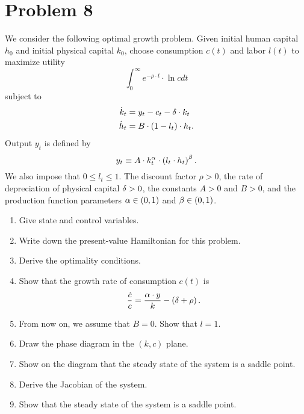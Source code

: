 \documentclass[letterpaper,12pt,leqno]{article}
\begin{document}
\section*{Problem 8}

We consider the following optimal growth problem. Given initial human capital $h_{0}$ and initial physical capital $k_{0}$, choose consumption $c(t) $ and labor $l(t) $ to maximize utility
\begin{equation*}
\int_{0}^{\infty}e^{-\rho\cdot  t}\cdot \ln{c} dt
\end{equation*}
subject to
\begin{align*}
\dot{k}_{t} &=y_{t}-c_{t}-\delta\cdot  k_{t} \\
\dot{h}_{t} &=B\cdot \left( 1-l_{t} \right)\cdot  h_{t}.
\end{align*}
Output $y_{t}$ is defined by
\[y_{t}\equiv A\cdot k_{t}^{\alpha}\cdot \left( l_{t}\cdot h_{t} \right) ^{\beta}.\]
We also impose that $0 \leq l_{t}\leq 1$. The discount factor $\rho>0$, the rate of depreciation of physical capital $\delta>0$, the constants $A>0$ and $B>0$, and the production function parameters $\alpha\in \left( 0,1 \right)$ and $\beta \in\left( 0,1 \right)$.

\begin{enumerate}
\item Give state and control variables.
\item Write down the present-value Hamiltonian for this problem.
\item Derive the optimality conditions. 
\item Show that the growth rate of consumption $c(t)$ is
\begin{equation*}
\frac{\dot{c}}{c}=\frac{\alpha\cdot  y}{k}-\left( \delta +\rho \right) .
\end{equation*}
\item From now on, we assume that $B=0$. Show that $l=1$.
\item Draw the phase diagram in the $(k,c)$ plane.
\item Show on the diagram that the steady state of the system is a saddle point.
\item Derive the Jacobian of the system.
\item Show that the steady state of the system is a saddle point.
\end{enumerate}
\end{document}

